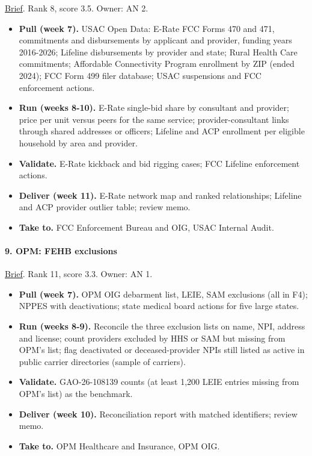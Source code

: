 \documentclass[letterpaper,11pt]{article}
\providecommand{\tightlist}{\setlength{\itemsep}{0pt}\setlength{\parskip}{0pt}}
\begin{document}
\href{agencies/fcc.pdf}{Brief}. Rank 8, score 3.5. Owner: AN 2.

\begin{itemize}
\tightlist
\item
  \textbf{Pull (week 7).} USAC Open Data: E-Rate FCC Forms 470 and 471,
  commitments and disbursements by applicant and provider, funding years
  2016-2026; Lifeline disbursements by provider and state; Rural Health
  Care commitments; Affordable Connectivity Program enrollment by ZIP
  (ended 2024); FCC Form 499 filer database; USAC suspensions and FCC
  enforcement actions.
\item
  \textbf{Run (weeks 8-10).} E-Rate single-bid share by consultant and
  provider; price per unit versus peers for the same service;
  provider-consultant links through shared addresses or officers;
  Lifeline and ACP enrollment per eligible household by area and
  provider.
\item
  \textbf{Validate.} E-Rate kickback and bid rigging cases; FCC Lifeline
  enforcement actions.
\item
  \textbf{Deliver (week 11).} E-Rate network map and ranked
  relationships; Lifeline and ACP provider outlier table; review memo.
\item
  \textbf{Take to.} FCC Enforcement Bureau and OIG, USAC Internal Audit.
\end{itemize}

\hypertarget{opm-fehb-exclusions}{%
\paragraph{9. OPM: FEHB exclusions}\label{opm-fehb-exclusions}}

\href{agencies/opm.pdf}{Brief}. Rank 11, score 3.3. Owner: AN 1.

\begin{itemize}
\tightlist
\item
  \textbf{Pull (week 7).} OPM OIG debarment list, LEIE, SAM exclusions
  (all in F4); NPPES with deactivations; state medical board actions for
  five large states.
\item
  \textbf{Run (weeks 8-9).} Reconcile the three exclusion lists on name,
  NPI, address and license; count providers excluded by HHS or SAM but
  missing from OPM's list; flag deactivated or deceased-provider NPIs
  still listed as active in public carrier directories (sample of
  carriers).
\item
  \textbf{Validate.} GAO-26-108139 counts (at least 1,200 LEIE entries
  missing from OPM's list) as the benchmark.
\item
  \textbf{Deliver (week 10).} Reconciliation report with matched
  identifiers; review memo.
\item
  \textbf{Take to.} OPM Healthcare and Insurance, OPM OIG.
\end{itemize}
\end{document}
